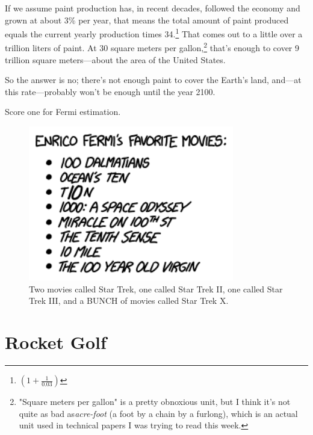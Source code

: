 {{If we assume paint production has, in recent decades, followed the economy and grown at about 3\% per year, that means the total amount of paint produced equals the current yearly production times 34.{\footnote{\((1+\tfrac{1}{0.03})\)} } That comes out to a little over a trillion liters of paint. At 30 square meters per gallon,{\footnote{"Square meters per gallon" is a pretty obnoxious unit, but I think it's not quite as bad as\emph{acre-foot} (a foot by a chain by a furlong), which is an actual unit used in technical papers I was trying to read this week.} } that's enough to cover 9 trillion square meters—about the area of the United States.}

{So the answer is no; there's not enough paint to cover the Earth's land, and—at this rate—probably won't be enough until the year 2100.}

{Score one for Fermi estimation.}

\begin{figure}[!htbp]
\centering
\includegraphics[scale=0.5, max width=0.8\textwidth]{imgs/a/84/paint_movies.png}
\caption{Two movies called Star Trek, one called Star Trek II, one called Star Trek III, and a BUNCH of movies called Star Trek X.}
\end{figure}

{
\chapter{Rocket Golf}
}

}
